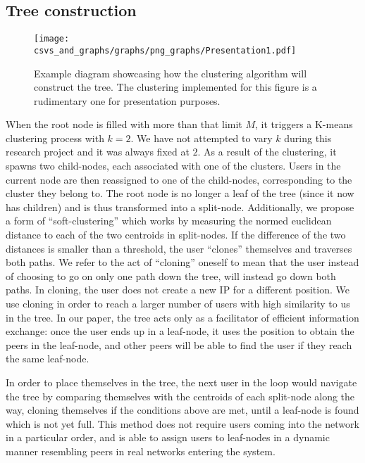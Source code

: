 \documentclass[10pt,journal]{IEEEtran}
\begin{document}
\subsection{Tree construction}
\begin{figure}
    \hspace*{-2.7cm}
    \texttt{[image: csvs\_and\_graphs/graphs/png\_graphs/Presentation1.pdf]} 
    \caption{Example diagram showcasing how the clustering algorithm will construct the tree. The clustering implemented for this figure is a rudimentary one for presentation purposes.}
    \label{fig:example_diagram}
\end{figure}


When the root node is filled with more than that limit $M$, it triggers a K-means clustering process with $k=2$. We have not attempted to vary $k$ during this research project and it was always fixed at $2$. As a result of the clustering, it spawns two child-nodes, each associated with one of the clusters. Users in the current node are then reassigned to one of the child-nodes, corresponding to the cluster they belong to. The root node is no longer a leaf of the tree (since it now has children) and is thus transformed into a split-node. Additionally, we propose a form of ``soft-clustering'' which works by measuring the normed euclidean distance to each of the two centroids in split-nodes. If the difference of the two distances is smaller than a threshold, the user ``clones'' themselves and traverses both paths. We refer to the act of ``cloning'' oneself to mean that the user instead of choosing to go on only one path down the tree, will instead go down both paths. In cloning, the user does not create a new IP for a different position. We use cloning in order to reach a larger number of users with high similarity to us in the tree. In our paper, the tree acts only as a facilitator of efficient information exchange: once the user ends up in a leaf-node, it uses the position to obtain the peers in the leaf-node, and other peers will be able to find the user if they reach the same leaf-node. %

In order to place themselves in the tree, the next user in the loop would navigate the tree by comparing themselves with the centroids of each split-node along the way, cloning themselves if the conditions above are met, until a leaf-node is found which is not yet full.
%
This method does not require users coming into the network in a particular order, and is able to assign users to leaf-nodes in a dynamic manner resembling peers in real networks entering the system. 
\end{document}
